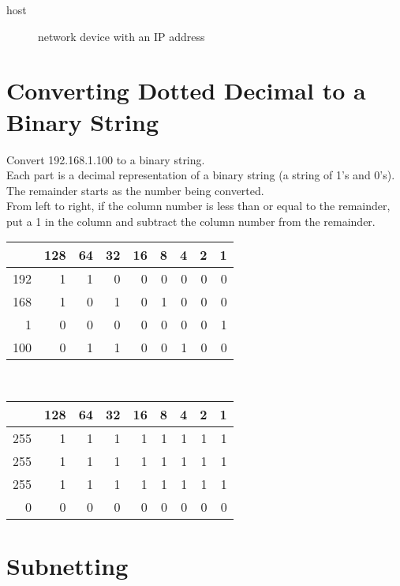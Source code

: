 \documentclass{article}
\begin{document}
\begin{description}

\item[host]
network device with an IP address

\end{description}

\section{Converting Dotted Decimal to a Binary String}

Convert 192.168.1.100 to a binary string.\\

Each part is a decimal representation of a binary string (a string of 1's and
0's).\\

The remainder starts as the number being converted.\\

From left to right, if the column number is less than or equal to the
remainder, put a 1 in the column and subtract the column number from the
remainder.\\

\begin{tabular}{ | r | r | r | r | r | r | r | r | r | }
\hline
    & 128 & 64 & 32 & 16 & 8 & 4 & 2 & 1 \\ \hline
192 &   1 &  1 &  0 &  0 & 0 & 0 & 0 & 0 \\ \hline
168 &   1 &  0 &  1 &  0 & 1 & 0 & 0 & 0 \\ \hline
  1 &   0 &  0 &  0 &  0 & 0 & 0 & 0 & 1 \\ \hline
100 &   0 &  1 &  1 &  0 & 0 & 1 & 0 & 0 \\ \hline
\end{tabular}\\

\begin{tabular}{ | r | r | r | r | r | r | r | r | r | }
\hline
    & 128 & 64 & 32 & 16 & 8 & 4 & 2 & 1 \\ \hline
255 &   1 &  1 &  1 &  1 & 1 & 1 & 1 & 1 \\ \hline
255 &   1 &  1 &  1 &  1 & 1 & 1 & 1 & 1 \\ \hline
255 &   1 &  1 &  1 &  1 & 1 & 1 & 1 & 1 \\ \hline
  0 &   0 &  0 &  0 &  0 & 0 & 0 & 0 & 0 \\ \hline
\end{tabular}

\section{Subnetting}
\end{document}
